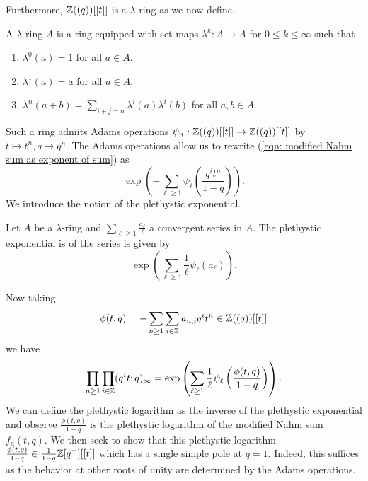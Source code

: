Furthermore, $\mathbb{Z}((q))[[t]]$ is a $\lambda$-ring as we now define. 
\begin{definition}\label{def: lambda-ring}
    A $\lambda$-ring $A$ is a ring equipped with set maps $\lambda^{k}:A\to A$ for $0\leq k\leq\infty$ such that 
    \begin{enumerate}[label=(\roman*)]
        \item $\lambda^{0}(a)=1$ for all $a\in A$.
        \item $\lambda^{1}(a)=a$ for all $a\in A$. 
        \item $\lambda^{n}(a+b)=\sum_{i+j=n}\lambda^{i}(a)\lambda^{i}(b)$ for all $a,b\in A$. 
    \end{enumerate}
\end{definition}
Such a ring admits Adams operations $\psi_{n}:\mathbb{Z}((q))[[t]]\to\mathbb{Z}((q))[[t]]$ by $t\mapsto t^{n},q\mapsto q^{n}$. The Adams operations allow us to rewrite (\ref{eqn: modified Nahm sum as exponent of sum}) as 
\begin{equation}\label{eqn: modified Nahm sum as exponent of Adams sum}
    \exp\left(-\sum_{\ell\geq1}\psi_{\ell}\left(\frac{q^{i}t^{n}}{1-q}\right)\right).
\end{equation}
We introduce the notion of the plethystic exponential.
\begin{definition}\label{def: Plethystic exponential}
    Let $A$ be a $\lambda$-ring and $\sum_{\ell\geq 1}\frac{a_{\ell}}{\ell}$ a convergent series in $A$. The plethystic exponential is of the series is given by 
    $$\exp\left(\sum_{\ell\geq 1}\frac{1}{\ell}\psi_{\ell}(a_{\ell})\right).$$
\end{definition}
Now taking 
$$\phi(t,q)=-\sum_{n\geq1}\sum_{i\in\mathbb{Z}}a_{n,i}q^{i}t^{n}\in\mathbb{Z}((q))[[t]]$$
we have 
\begin{equation*}\label{eqn: adams admissable Nahm sum}
    \prod_{n\geq1}\prod_{i\in\mathbb{Z}}(q^{i}t;q)_{\infty}=\exp\left(\sum_{\ell\geq1}\frac{1}{\ell}\psi_{\ell}\left(\frac{\phi(t,q)}{1-q}\right)\right).
\end{equation*}
We can define the plethystic logarithm as the inverse of the plethystic exponential and observe $\frac{\phi(t,q)}{1-q}$ is the plethystic logarithm of the modified Nahm sum $f_{a}(t,q)$. We then seek to show that this plethystic logarithm $\frac{\phi(t,q)}{1-q}\in\frac{1}{1-q}\mathbb{Z}[q^{\pm}][[t]]$ which has a single simple pole at $q=1$. Indeed, this suffices as the behavior at other roots of unity are determined by the Adams operations. 


